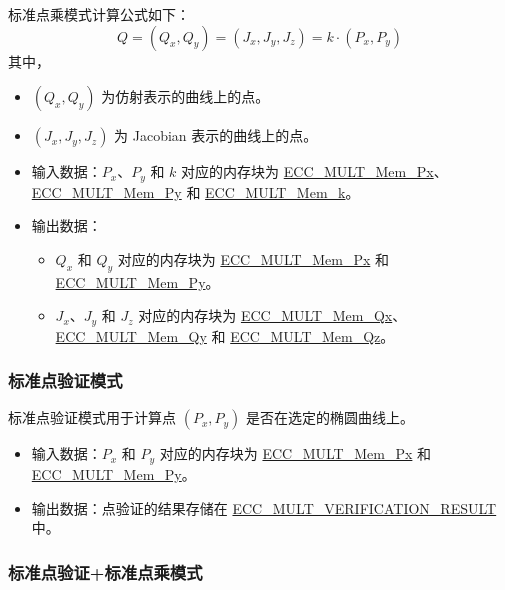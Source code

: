 \documentclass[main\_\_CN.tex]{subfiles}
\begin{document}
标准点乘模式计算公式如下：
\[
Q = (Q_x,Q_y) = (J_x,J_y,J_z) = k \cdot (P_x,P_y)
\]
其中，
\begin{itemize}
    \item $(Q_x,Q_y)$ 为仿射表示的曲线上的点。
    \item $(J_x,J_y,J_z)$ 为 Jacobian 表示的曲线上的点。
    \item 输入数据：$P_x$、$P_y$ 和 $k$ 对应的内存块为 \hyperref[tab:ecc-memory]{ECC\_MULT\_Mem\_Px}、\hyperref[tab:ecc-memory]{ECC\_MULT\_Mem\_Py} 和 \hyperref[tab:ecc-memory]{ECC\_MULT\_Mem\_k}。
    \item 输出数据：
    \begin{itemize}
        \item $Q_x$ 和 $Q_y$ 对应的内存块为 \hyperref[tab:ecc-memory]{ECC\_MULT\_Mem\_Px} 和 \hyperref[tab:ecc-memory]{ECC\_MULT\_Mem\_Py}。
        \item $J_x$、$J_y$ 和 $J_z$ 对应的内存块为 \hyperref[tab:ecc-memory]{ECC\_MULT\_Mem\_Qx}、\hyperref[tab:ecc-memory]{ECC\_MULT\_Mem\_Qy} 和 \hyperref[tab:ecc-memory]{ECC\_MULT\_Mem\_Qz}。
    \end{itemize}
\end{itemize}

\subsubsection{标准点验证模式}

标准点验证模式用于计算点 $(P_x, P_y)$ 是否在选定的椭圆曲线上。

\begin{itemize}
    \item 输入数据：$P_x$ 和 $P_y$ 对应的内存块为 \hyperref[tab:ecc-memory]{ECC\_MULT\_Mem\_Px} 和 \hyperref[tab:ecc-memory]{ECC\_MULT\_Mem\_Py}。
    \item 输出数据：点验证的结果存储在 \hyperref[fielddesc:ECCMULTVERIFICATIONRESULT]{ECC\_MULT\_VERIFICATION\_RESULT} 中。
\end{itemize}

\subsubsection{标准点验证+标准点乘模式}
\end{document}
